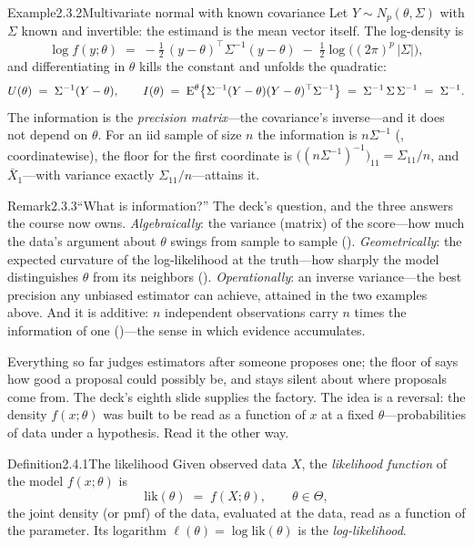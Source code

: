 \documentclass[main.tex]{subfiles}
\begin{document}
\begin{ObjL}{Example}{2.3.2}{Multivariate normal with known covariance}
Let $Y\sim N_p(\theta,\Sigma)$ with $\Sigma$ known and invertible: the estimand is the mean
vector itself. The log-density is
\[ \log f(y;\theta) \;=\; -\tfrac12\,(y-\theta)^{\top}\Sigma^{-1}(y-\theta)
   \;-\; \tfrac12\log\big((2\pi)^p\,|\Sigma|\big) , \]
and differentiating in $\theta$ kills the constant and unfolds the quadratic:
\[ U(\theta) \;=\; \Sigma^{-1}(Y-\theta) , \qquad
   I(\theta) \;=\; \mathrm{E}^{\theta}\big\{\Sigma^{-1}(Y-\theta)(Y-\theta)^{\top}\Sigma^{-1}\big\}
   \;=\; \Sigma^{-1}\,\Sigma\,\Sigma^{-1} \;=\; \Sigma^{-1} . \]
The information is the \emph{precision matrix}---the covariance's inverse---and it does not
depend on $\theta$. For an iid sample of size $n$ the information is $n\Sigma^{-1}$
(, coordinatewise), the floor for the first coordinate is
$\big((n\Sigma^{-1})^{-1}\big)_{11}=\Sigma_{11}/n$, and $\bar X_1$---with variance exactly
$\Sigma_{11}/n$---attains it.
\end{ObjL}

\begin{ObjL}{Remark}{2.3.3}{``What is information?''}
The deck's question, and the three answers the course now owns. \emph{Algebraically}: the
variance (matrix) of the score---how much the data's argument about $\theta$ swings from
sample to sample (). \emph{Geometrically}: the expected curvature of the
log-likelihood at the truth---how sharply the model distinguishes $\theta$ from its
neighbors (). \emph{Operationally}: an inverse variance---the best precision
any unbiased estimator can achieve, attained in the two examples above. And it is additive:
$n$ independent observations carry $n$ times the information of one ()---the
sense in which evidence accumulates.
\end{ObjL}


Everything so far judges estimators after someone proposes one; the floor of 
says how good a proposal could possibly be, and stays silent about where proposals come
from. The deck's eighth slide supplies the factory. The idea is a reversal: the density
$f(x;\theta)$ was built to be read as a function of $x$ at a fixed $\theta$---probabilities
of data under a hypothesis. Read it the other way.

\begin{Obj}{Definition}{2.4.1}{The likelihood}
Given observed data $X$, the \emph{likelihood function} of the model $f(x;\theta)$ is
\[ \mathrm{lik}(\theta) \;=\; f(X;\theta) , \qquad \theta\in\Theta , \]
the joint density (or pmf) of the data, evaluated at the data, read as a function of the
parameter. Its logarithm $\ell(\theta)=\log \mathrm{lik}(\theta)$ is the
\emph{log-likelihood}.
\end{Obj}
\end{document}
